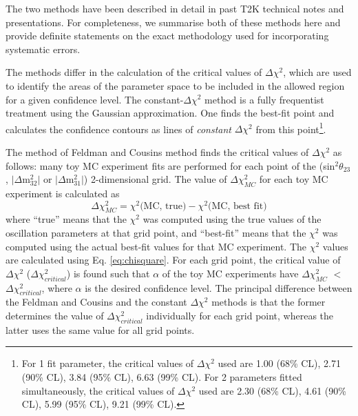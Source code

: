 The two methods have been described in detail in past T2K technical notes and presentations.
For completeness, we summarise both of these methods here
and provide definite statements on the exact methodology used for incorporating systematic errors.

The methods differ in the calculation of the critical values of $\Delta{\chi^{2}}$, which are used to identify the areas 
of the parameter space to be included in the allowed region for a given confidence level. The constant-$\Delta\chi^{2}$ 
method is a fully frequentist treatment using the Gaussian approximation.
One finds the best-fit point and calculates the confidence contours as lines of \emph{constant} $\Delta{\chi^{2}}$
from this point\footnote{
For 1 fit parameter, the critical values of $\Delta{\chi^{2}}$ used are
1.00 (68\% CL), 2.71 (90\% CL), 3.84 (95\% CL), 6.63 (99\% CL).
For 2 parameters fitted simultaneously, the critical values of $\Delta{\chi^{2}}$ used are
2.30 (68\% CL), 4.61 (90\% CL), 5.99 (95\% CL), 9.21 (99\% CL).
}.

The method of Feldman and Cousins method finds the critical values of $\Delta{\chi^{2}}$ as follows: many toy MC experiment 
fits are performed for each point of the (sin$^{2}\theta_{23}$, $|\Delta$m$^{2}_{32}|$ or $|\Delta$m$^{2}_{31}|$) 2-dimensional grid.
The value of $\Delta\chi^{2}_{MC}$ for each toy MC experiment is calculated as
\begin{equation}
\displaystyle
\Delta \chi^{2}_{MC} = \chi^{2} \textrm{(MC, true)} - \chi^{2} \textrm{(MC, best fit)}
\label{eq:deltachi2mc}
\end{equation}
where
``true'' means that the $\chi^{2}$ was computed using the true values of the oscillation parameters at that grid point, and
``best-fit'' means that the $\chi^{2}$ was computed using the actual best-fit values for that MC experiment.
The $\chi^{2}$ values are calculated using Eq. \ref{eq:chisquare}.
For each grid point, the critical value of $\Delta\chi^{2}$ ($\Delta\chi^{2}_{critical}$)
is found such that $\alpha$ of the toy MC experiments have $\Delta\chi^{2}_{MC}$ $<$ $\Delta\chi^{2}_{critical}$,
where $\alpha$ is the desired confidence level.
The principal difference between the Feldman and Cousins and the constant $\Delta\chi^{2}$ methods is that the former determines 
the value of $\Delta\chi^{2}_{critical}$ individually for each grid point, whereas the latter uses the same value 
for all grid points.

